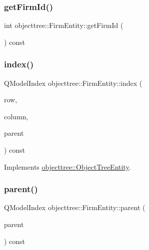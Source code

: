 \mbox{\label{classobjecttree_1_1_firm_entity_a963db72ceeb3c14522b8cce26ecae4c4}} 
\subsubsection{\texorpdfstring{getFirmId()}{getFirmId()}}
{\footnotesize\ttfamily int objecttree\+::\+Firm\+Entity\+::get\+Firm\+Id (\begin{DoxyParamCaption}{ }\end{DoxyParamCaption}) const\hspace{0.3cm}{\ttfamily [inline]}}

\mbox{\label{classobjecttree_1_1_firm_entity_a8df24819f408a5e5935e62123b4c91f0}} 
\subsubsection{\texorpdfstring{index()}{index()}}
{\footnotesize\ttfamily Q\+Model\+Index objecttree\+::\+Firm\+Entity\+::index (\begin{DoxyParamCaption}\item[{int}]{row,  }\item[{int}]{column,  }\item[{const Q\+Model\+Index \&}]{parent }\end{DoxyParamCaption}) const\hspace{0.3cm}{\ttfamily [virtual]}}



Implements \mbox{\hyperlink{classobjecttree_1_1_object_tree_entity_a9ccaab3b27e65b1ed8b22f00c57a1082}{objecttree\+::\+Object\+Tree\+Entity}}.

\mbox{\label{classobjecttree_1_1_firm_entity_ab5b9b04771a497f2967d2507148ed0d8}} 
\subsubsection{\texorpdfstring{parent()}{parent()}}
{\footnotesize\ttfamily Q\+Model\+Index objecttree\+::\+Firm\+Entity\+::parent (\begin{DoxyParamCaption}\item[{const Q\+Model\+Index \&}]{parent }\end{DoxyParamCaption}) const\hspace{0.3cm}{\ttfamily [virtual]}}



